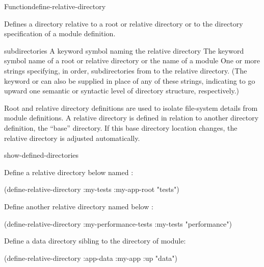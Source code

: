 \documentclass[10pt,twoside,english,pdftex]{article}
\begin{document}

\begin{functiondoc}{Function}{define-relative-directory}{  } 
%
%
%
%

\fnsyntax 

\fnpurpose Defines a directory relative to a root or relative directory or to
the directory specification of a module definition.

\fnpackage {}

\fnmodule {}

\fnargs
\begin{args}{subdirectories}
\arg[name] A keyword symbol naming the relative directory
\arg[directory] The keyword symbol name of a root or relative directory or the 
name of a module
\arg[subdirectories] One or more strings specifying, in order, subdirectories
from  to the relative directory. (The keyword  or
 can also be supplied in place of any of these strings, indicating
to go upward one semantic or syntactic level of directory structure,
respectively.)
\end{args}

\fndescription Root and relative directory definitions are used to isolate
file-system details from module definitions.  A relative directory is defined
in relation to another directory definition, the ``base'' directory.  If this
base directory location changes, the relative directory is adjusted automatically.

\begin{alsos}{show-defined-directories}
\end{alsos}

\fnexamples Define a relative directory below  named
:
\begin{example}
  (define-relative-directory :my-tests :my-app-root "tests")
\end{example}

Define another relative directory named
 below : 
\begin{example}
  (define-relative-directory :my-performance-tests :my-tests "performance") 
\end{example}

Define a data directory sibling to the  directory of  module: 
\begin{example}
  (define-relative-directory :app-data :my-app :up "data") 
\end{example}


\end{functiondoc}
\end{document}
